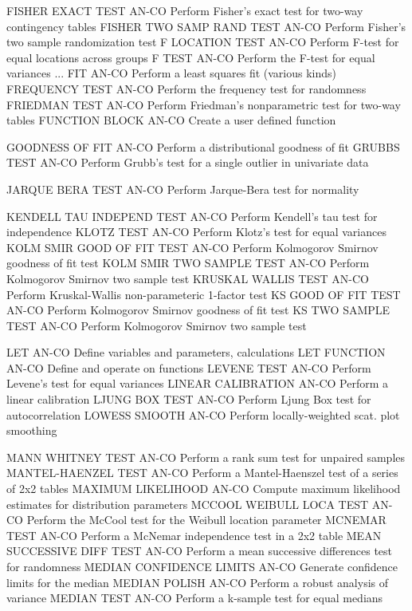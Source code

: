 FISHER EXACT TEST           AN-CO Perform Fisher's exact test for two-way contingency tables
FISHER TWO SAMP RAND TEST   AN-CO Perform Fisher's two sample randomization test
F LOCATION TEST             AN-CO Perform F-test for equal locations across groups
F TEST                      AN-CO Perform the F-test for equal variances
... FIT                     AN-CO Perform a least squares fit (various kinds)
FREQUENCY TEST              AN-CO Perform the frequency test for randomness
FRIEDMAN TEST               AN-CO Perform Friedman's nonparametric test for two-way tables
FUNCTION BLOCK              AN-CO Create a user defined function

GOODNESS OF FIT             AN-CO Perform a distributional goodness of fit
GRUBBS TEST                 AN-CO Perform Grubb's test for a single outlier in univariate data

JARQUE BERA TEST            AN-CO Perform Jarque-Bera test for normality

KENDELL TAU INDEPEND TEST   AN-CO Perform Kendell's tau test for independence
KLOTZ TEST                  AN-CO Perform Klotz's test for equal variances
KOLM SMIR GOOD OF FIT TEST  AN-CO Perform Kolmogorov Smirnov goodness of fit test
KOLM SMIR TWO SAMPLE TEST   AN-CO Perform Kolmogorov Smirnov two sample test
KRUSKAL WALLIS TEST         AN-CO Perform Kruskal-Wallis non-parameteric 1-factor test
KS GOOD OF FIT TEST         AN-CO Perform Kolmogorov Smirnov goodness of fit test
KS TWO SAMPLE TEST          AN-CO Perform Kolmogorov Smirnov two sample test

LET                         AN-CO Define variables and parameters, calculations
LET FUNCTION                AN-CO Define and operate on functions
LEVENE TEST                 AN-CO Perform Levene's test for equal variances
LINEAR CALIBRATION          AN-CO Perform a linear calibration
LJUNG BOX TEST              AN-CO Perform Ljung Box test for autocorrelation
LOWESS SMOOTH               AN-CO Perform locally-weighted scat. plot smoothing

MANN WHITNEY TEST           AN-CO Perform a rank sum test for unpaired samples
MANTEL-HAENZEL TEST         AN-CO Perform a Mantel-Haenszel test of a series of 2x2 tables
MAXIMUM LIKELIHOOD          AN-CO Compute maximum likelihood estimates for distribution parameters
MCCOOL WEIBULL LOCA TEST    AN-CO Perform the McCool test for the Weibull location parameter
MCNEMAR TEST                AN-CO Perform a McNemar independence test in a 2x2 table
MEAN SUCCESSIVE DIFF TEST   AN-CO Perform a mean successive differences test for randomness
MEDIAN CONFIDENCE LIMITS    AN-CO Generate confidence limits for the median
MEDIAN POLISH               AN-CO Perform a robust analysis of variance
MEDIAN TEST                 AN-CO Perform a k-sample test for equal medians

